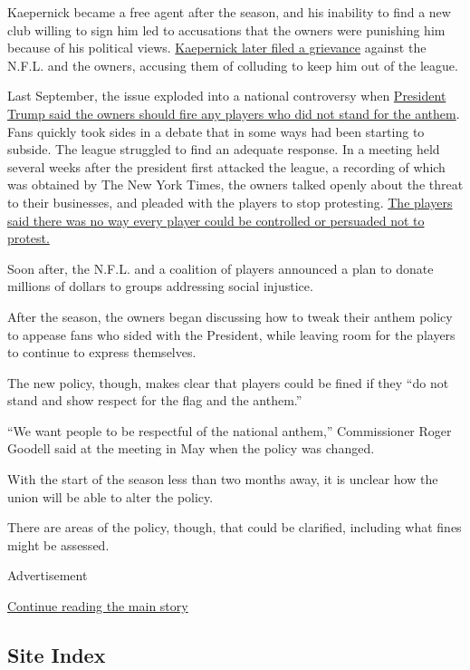 Kaepernick became a free agent after the season, and his inability to
find a new club willing to sign him led to accusations that the owners
were punishing him because of his political views.
\href{https://www.nytimes3xbfgragh.onion/2017/12/08/sports/kaepernick-collusion.html}{Kaepernick
later filed a grievance} against the N.F.L. and the owners, accusing
them of colluding to keep him out of the league.

Last September, the issue exploded into a national controversy when
\href{https://www.nytimes3xbfgragh.onion/2017/09/23/sports/football/trump-nfl-kaepernick.html}{President
Trump said the owners should fire any players who did not stand for the
anthem}. Fans quickly took sides in a debate that in some ways had been
starting to subside. The league struggled to find an adequate response.
In a meeting held several weeks after the president first attacked the
league, a recording of which was obtained by The New York Times, the
owners talked openly about the threat to their businesses, and pleaded
with the players to stop protesting.
\href{https://www.nytimes3xbfgragh.onion/2018/04/25/sports/nfl-owners-kaepernick.html}{The
players said there was no way every player could be controlled or
persuaded not to protest.}

Soon after, the N.F.L. and a coalition of players announced a plan to
donate millions of dollars to groups addressing social injustice.

After the season, the owners began discussing how to tweak their anthem
policy to appease fans who sided with the President, while leaving room
for the players to continue to express themselves.

The new policy, though, makes clear that players could be fined if they
``do not stand and show respect for the flag and the anthem.''

``We want people to be respectful of the national anthem,'' Commissioner
Roger Goodell said at the meeting in May when the policy was changed.

With the start of the season less than two months away, it is unclear
how the union will be able to alter the policy.

There are areas of the policy, though, that could be clarified,
including what fines might be assessed.

Advertisement

\protect\hyperlink{after-bottom}{Continue reading the main story}

\hypertarget{site-index}{%
\subsection{Site Index}\label{site-index}}

